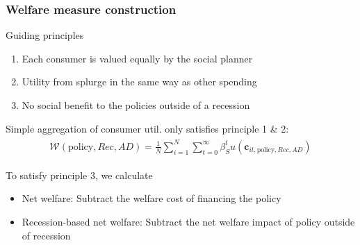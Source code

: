 \documentclass[pdflatex,aspectratio=169]{beamer}
\begin{document}
	\begin{frame}
		\frametitle{Welfare measure construction}
		\hypertarget{WelfareMeasure}{}
		
		Guiding principles
		
		\begin{enumerate}
			\item Each consumer is valued equally by the social planner 
			\item Utility from splurge in the same way as other spending
			\item No social benefit to the policies outside of a recession
		\end{enumerate} 
		
		\vspace{0.6cm}
		
		Simple aggregation of consumer util.
only satisfies principle 1 \& 2:
		\begin{equation}\begin{gathered}\begin{aligned}
			\mathcal{W}(\text{policy},Rec,AD) =\frac{1}{N}\sum_{i=1}^{N} \sum_{t=0}^{\infty} \beta_S^t u(\mathbf{c}_{it,\text{policy},Rec,AD})
		\end{aligned}\end{gathered}\end{equation}
		
		\pause
		
		To satisfy principle 3, we calculate
		
		\begin{itemize}[<+->]
			\item Net welfare: Subtract the welfare cost of financing the policy
			\item Recession-based net welfare: Subtract the net welfare impact of policy outside of recession
		\end{itemize}	
	
		\vspace{0.2cm}
		\hyperlink{WelfareMeasure1}{}
		
	\end{frame}
\end{document}
